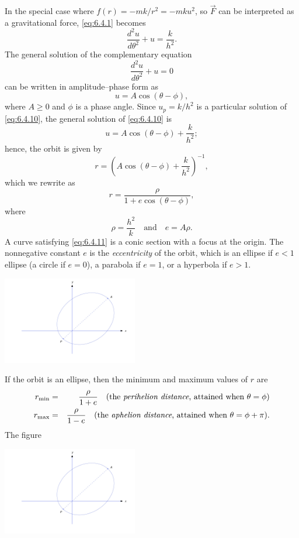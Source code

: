 \documentclass{ximera}
\begin{document}
In the special case where
 $f(r)=-mk/r^2=-mku^2$, so $\vec{F}$  can be interpreted
as a gravitational force, \eqref{eq:6.4.1}  becomes
\begin{equation} \label{eq:6.4.10}
 \frac{d^2u}{d\theta^2}+u=\frac{k}{h^2}.
\end{equation}
The general solution of the complementary equation
$$
 \frac{d^2u}{d\theta^2}+u=0
$$
can be written in amplitude--phase form as
$$
u=A\cos(\theta-\phi),
$$
where $A\ge0$ and $\phi$ is a phase angle.
Since $u_p=k/h^2$ is a particular solution of \eqref{eq:6.4.10},
the general solution of \eqref{eq:6.4.10} is
$$
u=A\cos(\theta-\phi)+\frac{k}{h^2};
$$
hence, the orbit is given by
$$
r=\left(A\cos(\theta-\phi)+\frac{k}{h^2}\right)^{-1},
$$
which we rewrite as
\begin{equation} \label{eq:6.4.11}
r=\frac{\rho}{1+e\cos(\theta-\phi)},
\end{equation}
where
$$
\rho=\frac{h^2}{k}\quad\mbox{and}\quad e=A\rho.
$$
A curve satisfying \eqref{eq:6.4.11} is a conic section with a focus at
the origin. %
The nonnegative constant $e$ is
 the \textit{eccentricity} of the orbit, which is
an ellipse if
$e<1$
ellipse (a circle if $e=0$), a parabola if $e=1$, or a hyperbola if $e>1$.

\begin{image}
 \includegraphics[height=1.5in]{fig060404.jpg}
 \end{image}

If  the orbit is an ellipse, then the minimum and maximum
values of $r$  are
\begin{eqnarray*}
r_{\min}&=&\frac{\rho}{1+e}\quad\mbox{(the \textit{perihelion
distance}, attained when
$\theta=\phi$)}  \\
 r_{\max}&=&\frac{\rho}{1-e}\quad\mbox{(the
\textit{aphelion distance}, attained when
$\theta=\phi+\pi$)}.
\end{eqnarray*}
The figure
\begin{image}
 \includegraphics[height=1.5in]{fig060404.jpg}
 \end{image}
\end{document}
